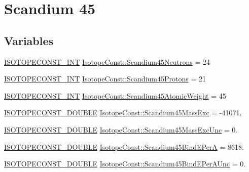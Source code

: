 \hypertarget{group___isotope_const-_scandium-_sc45}{}\section{Scandium 45}
\label{group___isotope_const-_scandium-_sc45}
\subsection*{Variables}
\begin{DoxyCompactItemize}
\item 
\mbox{\hyperlink{group___isotope_const-_macros_ga5f18360b3e99483a35c32d789e62621c}{I\+S\+O\+T\+O\+P\+E\+C\+O\+N\+S\+T\+\_\+\+I\+NT}} \mbox{\hyperlink{group___isotope_const-_scandium-_sc45_ga0d30e5feabbaaa9115ed96cf3d3a4938}{Isotope\+Const\+::\+Scandium45\+Neutrons}} = 24
\item 
\mbox{\hyperlink{group___isotope_const-_macros_ga5f18360b3e99483a35c32d789e62621c}{I\+S\+O\+T\+O\+P\+E\+C\+O\+N\+S\+T\+\_\+\+I\+NT}} \mbox{\hyperlink{group___isotope_const-_scandium-_sc45_ga2f03bbc348934fbb65cb8064552cea9f}{Isotope\+Const\+::\+Scandium45\+Protons}} = 21
\item 
\mbox{\hyperlink{group___isotope_const-_macros_ga5f18360b3e99483a35c32d789e62621c}{I\+S\+O\+T\+O\+P\+E\+C\+O\+N\+S\+T\+\_\+\+I\+NT}} \mbox{\hyperlink{group___isotope_const-_scandium-_sc45_ga260c726c21305c9146e2bfe943ea2a39}{Isotope\+Const\+::\+Scandium45\+Atomic\+Weight}} = 45
\item 
\mbox{\hyperlink{group___isotope_const-_macros_ga8f45a7272ce02c0b4c65c44636ed719a}{I\+S\+O\+T\+O\+P\+E\+C\+O\+N\+S\+T\+\_\+\+D\+O\+U\+B\+LE}} \mbox{\hyperlink{group___isotope_const-_scandium-_sc45_gad31aa83e40c0fca5dfe3c16d6e809c21}{Isotope\+Const\+::\+Scandium45\+Mass\+Exc}} = -\/41071.
\item 
\mbox{\hyperlink{group___isotope_const-_macros_ga8f45a7272ce02c0b4c65c44636ed719a}{I\+S\+O\+T\+O\+P\+E\+C\+O\+N\+S\+T\+\_\+\+D\+O\+U\+B\+LE}} \mbox{\hyperlink{group___isotope_const-_scandium-_sc45_ga94f440f02d442db20c93baf37267e0da}{Isotope\+Const\+::\+Scandium45\+Mass\+Exc\+Unc}} = 0.
\item 
\mbox{\hyperlink{group___isotope_const-_macros_ga8f45a7272ce02c0b4c65c44636ed719a}{I\+S\+O\+T\+O\+P\+E\+C\+O\+N\+S\+T\+\_\+\+D\+O\+U\+B\+LE}} \mbox{\hyperlink{group___isotope_const-_scandium-_sc45_ga02f1b161f5621ca8383b1a523159b313}{Isotope\+Const\+::\+Scandium45\+Bind\+E\+PerA}} = 8618.
\item 
\mbox{\hyperlink{group___isotope_const-_macros_ga8f45a7272ce02c0b4c65c44636ed719a}{I\+S\+O\+T\+O\+P\+E\+C\+O\+N\+S\+T\+\_\+\+D\+O\+U\+B\+LE}} \mbox{\hyperlink{group___isotope_const-_scandium-_sc45_gac5e677bc041b7e6111f8797904d92fe9}{Isotope\+Const\+::\+Scandium45\+Bind\+E\+Per\+A\+Unc}} = 0.

\end{DoxyCompactItemize}
